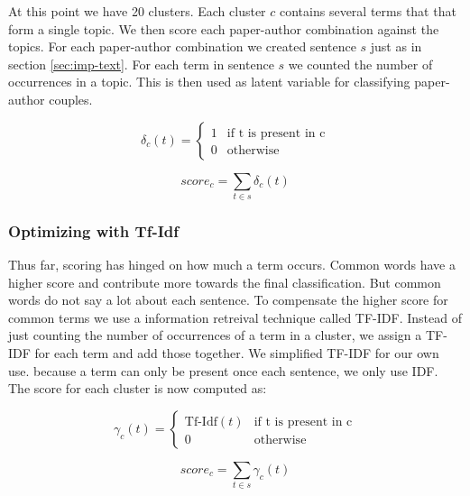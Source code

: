 At this point we have 20 clusters. Each cluster $c$ contains several terms that that form a single topic. We then score each paper-author combination against the topics. For each  paper-author combination we created sentence $s$ just as in section \ref{sec:imp-text}. For each term in sentence $s$ we counted the number of occurrences in a topic. This is then used as latent variable for classifying paper-
author couples.

\begin{multicols}{2}
\[ \delta_c(t) =\left\{ \begin{matrix} 1 & \mbox{if t is present in c} \\ 0 & \mbox{otherwise} \end{matrix} \right.\]

\[ score_c = \sum_{t \in s} \delta_c(t) \]
\end{multicols}

\subsubsection*{Optimizing with Tf-Idf}

Thus far, scoring has hinged on how much a term occurs. Common words have a higher score and contribute more towards the final classification. But common words do not say a lot about each sentence\cite{chowdhury2010introduction}. To compensate the higher score for common terms we use a information retreival technique called TF-IDF. Instead of just counting the number of occurrences of a term in a cluster, we assign a TF-IDF for each term and add those together. We simplified TF-IDF for our own use. because a term can only be present once each sentence, we only use IDF. The score for each cluster is now computed as:


\begin{multicols}{2}
\[ \gamma_c(t) =\left\{ \begin{matrix} \mbox{Tf-Idf}(t) & \mbox{if t is present in c} \\ 0 & \mbox{otherwise} \end{matrix} \right.\]


\[ score_c = \sum_{t \in s} \gamma_c(t) \]
\end{multicols}